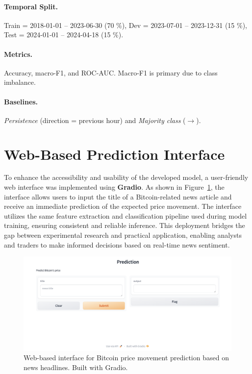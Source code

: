 \documentclass[12pt,a4paper]{article}
\begin{document}
\paragraph{Temporal Split.}  
Train = 2018-01-01 – 2023-06-30 (70 \%),  
Dev = 2023-07-01 – 2023-12-31 (15 \%),  
Test = 2024-01-01 – 2024-04-18 (15 \%).

\paragraph{Metrics.}  
Accuracy, macro-F1, and ROC-AUC. Macro-F1 is primary due to class
imbalance.

\paragraph{Baselines.}  
\emph{Persistence} (direction = previous hour) and
\emph{Majority class} (\(\rightarrow\)).



\section*{Web-Based Prediction Interface}

To enhance the accessibility and usability of the developed model, a user-friendly web interface was implemented using \textbf{Gradio}. As shown in Figure~\ref{fig:gradio-ui}, the interface allows users to input the title of a Bitcoin-related news article and receive an immediate prediction of the expected price movement. The interface utilizes the same feature extraction and classification pipeline used during model training, ensuring consistent and reliable inference. This deployment bridges the gap between experimental research and practical application, enabling analysts and traders to make informed decisions based on real-time news sentiment.

\begin{figure}[H]
    \centering
    \includegraphics[width=0.9\linewidth]{Api.png}
    \caption{Web-based interface for Bitcoin price movement prediction based on news headlines. Built with Gradio.}
    \label{fig:gradio-ui}
\end{figure}
\end{document}
